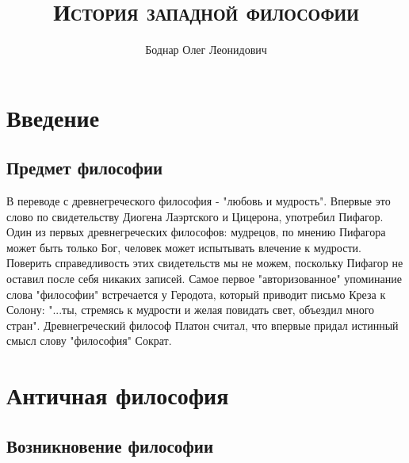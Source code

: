 
\setmainfont{Times New Roman}
\title{\textbf{\textsc{История западной философии}}}
\author{Боднар Олег Леонидович}
\date{} %
\linespread{1.3} %


	
\maketitle %
	\thispagestyle{empty} %
	\clearpage %
	\setcounter{page}{1} %
		
	\tableofcontents
	\clearpage
	\section{Введение}
	\subsection{Предмет философии}
	
	\par В переводе с древнегреческого философия - "любовь и мудрость". Впервые это слово 
	по свидетельству Диогена Лаэртского и Цицерона, употребил Пифагор. Один из первых 
	древнегреческих философов: мудрецов, по мнению Пифагора может быть только Бог, человек 
	может испытывать влечение к мудрости. Поверить справедливость этих свидетельств мы не 
	можем, поскольку Пифагор не оставил после себя никаких записей.  Самое первое 
	"авторизованное" упоминание слова "философии" встречается у Геродота, который приводит 
	письмо Креза к Солону: "...ты, стремясь к мудрости и желая повидать свет, объездил 
	много стран". Древнегреческий философ Платон считал, что впервые придал истинный 
	смысл слову "философия" Сократ. 
	\clearpage
	
	\section{Античная философия}
	
	\subsection{Возникновение философии}
